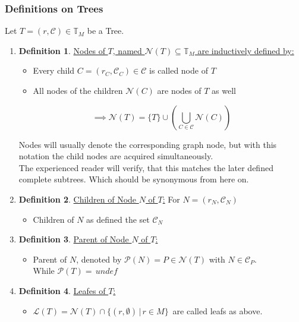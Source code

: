 \documentclass[a4paper,12pt]{article}
\theoremstyle{definition}
\newtheorem{definition}{Definition}[section]
\begin{document}
		\subsubsection{Definitions on Trees}
		Let $T=(r,\mathcal{C})\in \mathds{T}_M$ be a Tree.
		\begin{enumerate}[$ $]
			\item \begin{definition}
				\underline{Nodes of $T$, named $\mathcal{N}(T)\subseteq \mathds{T}_M$ are inductively defined by:}
				\begin{itemize}
					\item Every child $C=(r_C,\mathcal{C}_C)\in \mathcal{C}$ is called node of $T$
					\item  All nodes of the children $\mathcal{N}(C)$ are nodes of $T$ as well
				\end{itemize}
				\[\implies \mathcal{N}(T)=\{T\}\cup\left (\bigcup_{C\in\mathcal{C}} \mathcal{N}(C) \right)\]
				
				Nodes will usually denote the corresponding graph node, but with this notation the child nodes are acquired simultaneously. \\The experienced reader will verify, that this matches the later defined complete subtrees. Which should be synonymous from here on.
			\end{definition}
			\item \begin{definition}
				\underline{Children of Node $N$ of $T$:}
				For $N=(r_N, \mathcal{C}_N)$
				\begin{itemize}
					\item Children of $N$ as defined the set $\mathcal{C}_N$
				\end{itemize}
			\end{definition}
			\item \begin{definition}
				\underline{Parent of Node $N$ of $T$:}
				\begin{itemize}
					\item Parent of $N$, denoted by $\mathcal{P}(N)=P\in \mathcal{N}(T)$ with $N\in \mathcal{C}_P$.\\
					While $\mathcal{P}(T)=\,undef$
				\end{itemize}
			\end{definition}
			\item \begin{definition}
				\underline{Leafes of $T$:}
				\begin{itemize}
					\item $\mathcal{L}(T)= \mathcal{N}(T) \cap \{(r,\emptyset)\,\vert\, r\in M\}\,$ are called leafs as above.
				\end{itemize}
			\end{definition}
		\end{enumerate}
\end{document}

